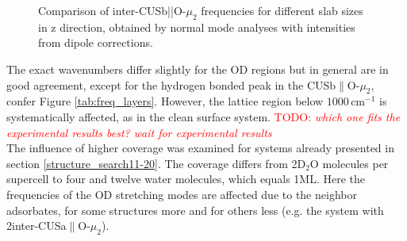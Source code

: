 \documentclass[11pt,DIV=13,BCOR=5mm,a4paper,headinclude]{scrbook}
\newcommand\todo[1]{\textcolor{red}{TODO: \textit{{#1}}}}
\begin{document}
\begin{figure}[!h]
    \centering
             \quad
             \quad
             \caption{Comparison of inter-CUSb||O-$\mu_2$ frequencies for different slab sizes in z direction, obtained by normal mode analyses with intensities from dipole corrections.}
            \label{abb:iCb2_size_comp}
\end{figure}
The exact wavenumbers differ slightly for the OD regions but in general are in good agreement, except for the hydrogen bonded peak in the CUSb$\parallel$O-$\mu_2$, confer Figure \ref{tab:freq_layers}.
However, the lattice region below $1000\,$cm$^{-1}$ is systematically affected, as in the clean surface system.
\todo{which one fits the experimental results best? wait for experimental results}
\\
The influence of higher coverage was examined for systems already presented in section \ref{structure_search11-20}.
The coverage differs from 2D$_2$O molecules per supercell to four and twelve water molecules, which equals 1ML.
Here the frequencies of the OD stretching modes are affected due to the neighbor adsorbates, for some structures more and for others less (e.g. the system with 2inter-CUSa$\parallel$O-$\mu_2$).
\end{document}
